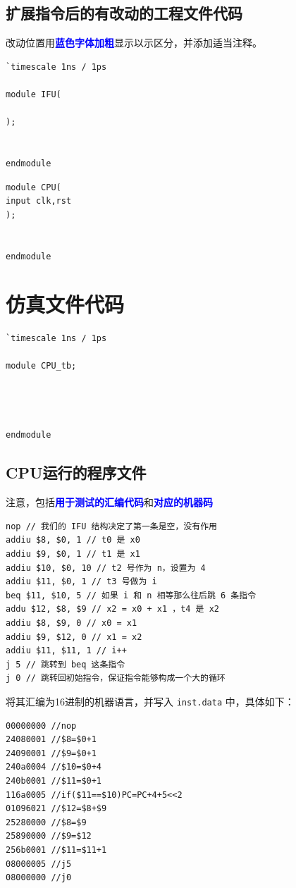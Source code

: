\documentclass[]{USTBReport}
\newcommand{\hl}[1]{\textbf{\textcolor{blue}{#1}}}
\begin{document}
    \FloatBarrier
    \subsection{扩展指令后的有改动的工程文件代码}

    改动位置用\hl{蓝色字体加粗}显示以示区分，并添加适当注释。


    \begin{lstlisting}[caption = 文件名1.v]
`timescale 1ns / 1ps

module IFU(

);


endmodule
    \end{lstlisting}

    \begin{lstlisting}[caption = 文件名2.v]
module CPU(
input clk,rst
);


endmodule
    \end{lstlisting}

    \FloatBarrier
    \section{仿真文件代码}
    \begin{lstlisting}[caption = 文件名.v]
`timescale 1ns / 1ps

module CPU_tb;




endmodule
    \end{lstlisting}

    \FloatBarrier
    \subsection{CPU运行的程序文件}
    注意，包括\hl{用于测试的汇编代码}和\hl{对应的机器码}

    \begin{lstlisting}[caption = 文件名.asm]
nop // 我们的 IFU 结构决定了第一条是空，没有作用
addiu $8, $0, 1 // t0 是 x0
addiu $9, $0, 1 // t1 是 x1
addiu $10, $0, 10 // t2 号作为 n，设置为 4
addiu $11, $0, 1 // t3 号做为 i
beq $11, $10, 5 // 如果 i 和 n 相等那么往后跳 6 条指令
addu $12, $8, $9 // x2 = x0 + x1 ，t4 是 x2
addiu $8, $9, 0 // x0 = x1
addiu $9, $12, 0 // x1 = x2
addiu $11, $11, 1 // i++
j 5 // 跳转到 beq 这条指令
j 0 // 跳转回初始指令，保证指令能够构成一个大的循环
    \end{lstlisting}
    将其汇编为16进制的机器语言，并写入 \texttt{inst.data} 中，具体如下：

    \begin{lstlisting}[caption = inst.data]
00000000 //nop
24080001 //$8=$0+1
24090001 //$9=$0+1
240a0004 //$10=$0+4
240b0001 //$11=$0+1
116a0005 //if($11==$10)PC=PC+4+5<<2
01096021 //$12=$8+$9
25280000 //$8=$9
25890000 //$9=$12
256b0001 //$11=$11+1
08000005 //j5
08000000 //j0
    \end{lstlisting}
\end{document}
